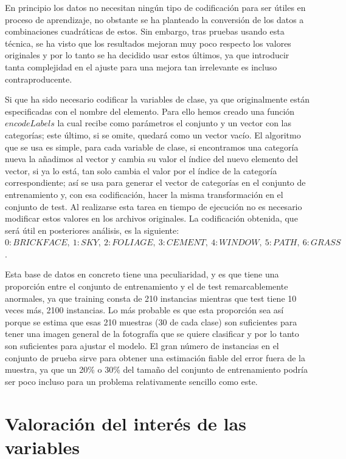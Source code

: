 \documentclass{article}
\begin{document}
	En principio los datos no necesitan ningún tipo de codificación para ser útiles en proceso de aprendizaje, no obstante se ha planteado la conversión de los datos a combinaciones cuadráticas de estos. Sin embargo, tras pruebas usando esta técnica, se ha visto que los resultados mejoran muy poco respecto los valores originales y por lo tanto se ha decidido usar estos últimos, ya que introducir tanta complejidad en el ajuste para una mejora tan irrelevante es incluso contraproducente.
	\par
	Si que ha sido necesario codificar la variables de clase, ya que originalmente están especificadas con el nombre del elemento. Para ello hemos creado una función $encodeLabels$ la cual recibe como parámetros el conjunto y un vector con las categorías; este último, si se omite, quedará como un vector vacío. El algoritmo que se usa es simple, para cada variable de clase, si encontramos una categoría nueva la añadimos al vector y cambia su valor el índice del nuevo elemento del vector, si ya lo está, tan solo cambia el valor por el índice de la categoría correspondiente; así se usa para generar el vector de categorías en el conjunto de entrenamiento y, con esa codificación, hacer la misma transformación en el conjunto de test. Al realizarse esta tarea en tiempo de ejecución no es necesario modificar estos valores en los archivos originales. La codificación obtenida, que será útil en posteriores análisis, es la siguiente: $0:BRICKFACE,\ 1:SKY,\ 2:FOLIAGE,\ 3:CEMENT,\ 4:WINDOW,\ 5:PATH,\ 6:GRASS$.
	\par
	Esta base de datos en concreto tiene una peculiaridad, y es que tiene una proporción entre el conjunto de entrenamiento y el de test remarcablemente anormales, ya que training consta de 210 instancias mientras que test tiene 10 veces más, 2100 instancias. Lo más probable es que esta proporción sea así porque se estima que esas 210 muestras (30 de cada clase) son suficientes para tener una imagen general de la fotografía que se quiere clasificar y por lo tanto son suficientes para ajustar el modelo. El gran número de instancias en el conjunto de prueba sirve para obtener una estimación fiable del error fuera de la muestra, ya que un 20\% o 30\% del tamaño del conjunto de entrenamiento podría ser poco incluso para un problema relativamente sencillo como este.
	
	\section{Valoración del interés de las variables}
	
\end{document}
